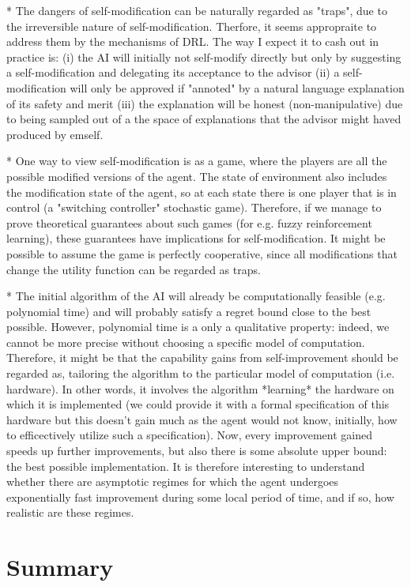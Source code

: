 \documentclass[a4paper]{article}
\begin{document}
* The dangers of self-modification can be naturally regarded as "traps", due to the irreversible nature of self-modification. Therfore, it seems appropraite to address them by the mechanisms of DRL. The way I expect it to cash out in practice is: (i) the AI will initially not self-modify directly but only by suggesting a self-modification and delegating its acceptance to the advisor (ii) a self-modification will only be approved if "annoted" by a natural language explanation of its safety and merit (iii) the explanation will be honest (non-manipulative) due to being sampled out of a the space of explanations that the advisor might haved produced by emself.

* One way to view self-modification is as a game, where the players are all the possible modified versions of the agent. The state of environment also includes the modification state of the agent, so at each state there is one player that is in control (a "switching controller" stochastic game). Therefore, if we manage to prove theoretical guarantees about such games (for e.g. fuzzy reinforcement learning), these guarantees have implications for self-modification. It might be possible to assume the game is perfectly cooperative, since all modifications that change the utility function can be regarded as traps.

* The initial algorithm of the AI will already be computationally feasible (e.g. polynomial time) and will probably satisfy a regret bound close to the best possible. However, polynomial time is a only a qualitative property: indeed, we cannot be more precise without choosing a specific model of computation. Therefore, it might be that the capability gains from self-improvement should be regarded as, tailoring the algorithm to the particular model of computation (i.e. hardware). In other words, it involves the algorithm *learning* the hardware on which it is implemented (we could provide it with a formal specification of this hardware but this doesn't gain much as the agent would not know, initially, how to efficectively utilize such a specification). Now, every improvement gained speeds up further improvements, but also there is some absolute upper bound: the best possible implementation. It is therefore interesting to understand whether there are asymptotic regimes for which the agent undergoes exponentially fast improvement during some local period of time, and if so, how realistic are these regimes.

\section{Summary}
\end{document}

